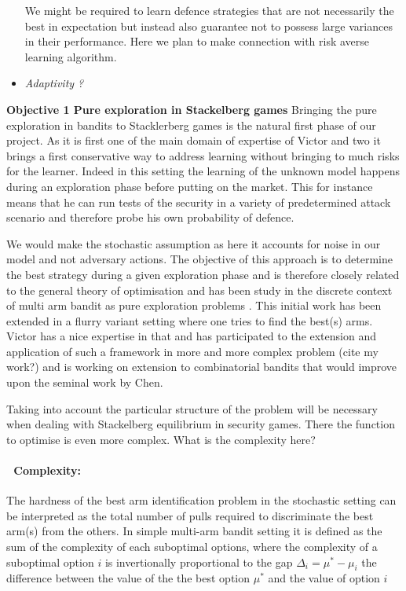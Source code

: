 \begin{itemize}
 We might be required to learn defence strategies that are not necessarily the best in expectation but instead also guarantee not to possess large variances in their performance. Here we plan to make connection with risk averse learning algorithm.
 \item \textit{Adaptivity ?}
\end{itemize}


\textbf{Objective 1 Pure exploration in Stackelberg games}
Bringing the pure exploration in bandits to Stacklerberg games is the natural first phase of our project. As it is first one of the main domain of expertise of Victor and two it brings a first conservative way to address learning without bringing to much risks for the learner. Indeed in this setting the learning of the unknown model happens during an exploration phase before putting on the market.  This for instance means that he can run tests of the security in a variety of predetermined attack scenario and therefore  probe his own probability of defence.

We would make the stochastic assumption as here it accounts for noise in our model and not adversary actions.
 The objective of this  approach is to determine  the best strategy during a given exploration phase and  is therefore  closely related to the general theory of optimisation and has been study in the discrete context of multi arm bandit as pure exploration problems \cite{Audibert10BA}. This initial work has been extended in a flurry variant setting where one tries to find the best(s) arms.
Victor has a nice expertise in that and has participated to the extension and application of such a framework in more and more complex problem (cite my work?) and is working on extension to combinatorial bandits that would improve upon the seminal work by Chen.


 Taking into account the particular  structure of the problem will be necessary when dealing with Stackelberg equilibrium in security games. There the function to optimise is even more complex. What is the complexity here?
 
 \paragraph{\textbullet$\;$  Complexity:} The hardness of the best arm identification problem in the stochastic setting can be interpreted as the total number of pulls required to discriminate the best arm(s) from the others. In simple multi-arm bandit setting it is defined as the sum of the complexity of each suboptimal options, where the complexity of a suboptimal option $i$ is invertionally proportional to the gap $\Delta_i= \mu^*- \mu_i$  the difference between the value of the the best option $\mu^*$ and the value of option $i$
 
